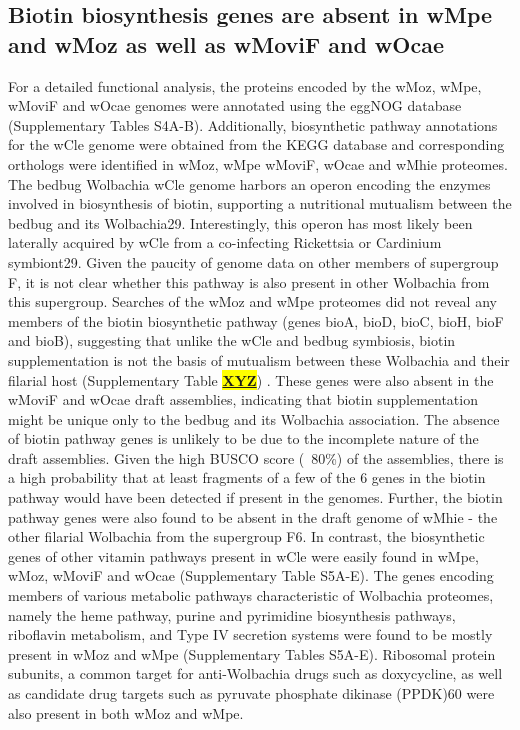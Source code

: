 \documentclass[10pt, a4paper, twocolumn]{article} %
\begin{document}
\subsection{Biotin biosynthesis genes are absent in wMpe and wMoz as well as wMoviF and wOcae}
For a detailed functional analysis, the proteins encoded by the wMoz, wMpe, wMoviF and wOcae genomes were annotated using the eggNOG database (Supplementary Tables S4A-B). Additionally, biosynthetic pathway annotations for the wCle genome were obtained from the KEGG database and corresponding orthologs were identified in wMoz, wMpe wMoviF, wOcae and wMhie proteomes. 
The bedbug Wolbachia wCle genome harbors an operon encoding the enzymes involved in biosynthesis of biotin, supporting a nutritional mutualism between the bedbug and its Wolbachia29. Interestingly, this operon has most likely been laterally acquired by wCle from a co-infecting Rickettsia or Cardinium symbiont29. Given the paucity of genome data on other members of supergroup F, it is not clear whether this pathway is also present in other Wolbachia from this supergroup. Searches of the wMoz and wMpe proteomes did not reveal any members of the biotin biosynthetic pathway (genes bioA, bioD, bioC, bioH, bioF and bioB), suggesting that unlike the wCle and bedbug symbiosis, biotin supplementation is not the basis of mutualism between these Wolbachia and their filarial host (Supplementary Table \underline{\textbf{\colorbox{Yellow}{XYZ}}}) . These genes were also absent in the wMoviF and wOcae draft assemblies, indicating that biotin supplementation might be unique only to the bedbug and its Wolbachia association.  The absence of biotin pathway genes is unlikely to be due to the incomplete nature of the draft assemblies. Given the high BUSCO score (~80\%) of the assemblies, there is a high probability that at least fragments of a few of the 6 genes in the biotin pathway would have been detected if present in the genomes. Further, the biotin pathway genes were also found to be absent in the draft genome of wMhie - the other filarial Wolbachia from the supergroup F6. In contrast, the biosynthetic genes of other vitamin pathways present in wCle were easily found in wMpe, wMoz, wMoviF and wOcae (Supplementary Table S5A-E). 
The genes encoding members of various metabolic pathways characteristic of Wolbachia proteomes, namely the heme pathway, purine and pyrimidine biosynthesis pathways, riboflavin metabolism, and Type IV secretion systems were found to be mostly present in wMoz and wMpe (Supplementary Tables S5A-E). Ribosomal protein subunits, a common target for anti-Wolbachia drugs such as doxycycline, as well as candidate drug targets such as pyruvate phosphate dikinase (PPDK)60 were also present in both wMoz and wMpe. 
\end{document}
